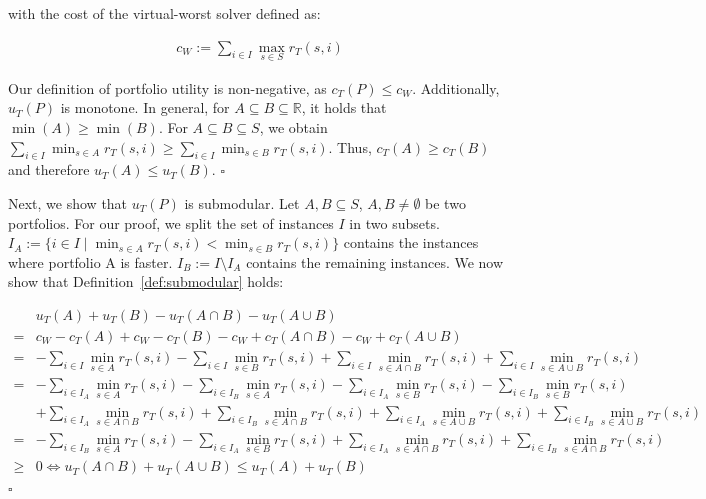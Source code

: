 \documentclass[conference]{IEEEtran}
\begin{document}
with the cost of the virtual-worst solver defined as:

\begin{align*}
	c_W := \sum_{i \in I}{\max_{s \in S}{r_T(s,i)}} \tag*{Virtual Worst Solver}
\end{align*}

Our definition of portfolio utility is non-negative, as $c_{T}(P) \leq c_W$.
Additionally, $u_{T}(P)$ is monotone.
In general, for $A \subseteq B \subseteq \mathbb{R}$, it holds that $\min(A) \geq \min(B)$.
For $A \subseteq B \subseteq S$, we obtain $\sum_{i \in I}{\min_{s \in A}{r_T(s,i)}} \geq \sum_{i \in I}{\min_{s \in B}{r_T(s,i)}}$.
Thus, $c_{T}(A) \geq c_{T}(B)$ and therefore $u_{T}(A) \leq u_{T}(B)$. \hfill$\square$

Next, we show that $u_{T}(P)$ is submodular.
Let $A,B \subseteq S$, $A,B \neq \emptyset$ be two portfolios.
For our proof, we split the set of instances $I$ in two subsets.
$I_A := \{i \in I \mid \min_{s \in A}{r_T(s,i)} < \min_{s \in B}{r_T(s,i)} \}$ contains the instances where portfolio A is faster.
$I_B := I \setminus I_A$ contains the remaining instances.
We now show that Definition~\ref{def:submodular} holds:

\begin{align*}
	& u_{T}(A) + u_{T}(B) - u_{T}(A \cap B) - u_{T}(A \cup B)\\
	= & c_W - c_{T}(A) + c_W - c_{T}(B) - c_W + c_{T}(A \cap B) - c_W + c_{T}(A \cup B)\\
	= & - \sum_{i \in I}{\min_{s \in A}{r_T(s,i)}} - \sum_{i \in I}{\min_{s \in B}{r_T(s,i)}} + \sum_{i \in I}{\min_{s \in A \cap B}{r_T(s,i)}} + \sum_{i \in I}{\min_{s \in A \cup B}{r_T(s,i)}}\\
	= & - \sum_{i \in I_A}{\min_{s \in A}{r_T(s,i)}} - \sum_{i \in I_B}{\min_{s \in A}{r_T(s,i)}} - \sum_{i \in I_A}{\min_{s \in B}{r_T(s,i)}} - \sum_{i \in I_B}{\min_{s \in B}{r_T(s,i)}}\\
	& + \sum_{i \in I_A}{\min_{s \in A \cap B}{r_T(s,i)}} + \sum_{i \in I_B}{\min_{s \in A \cap B}{r_T(s,i)}} + \sum_{i \in I_A}{\min_{s \in A \cup B}{r_T(s,i)}} + \sum_{i \in I_B}{\min_{s \in A \cup B}{r_T(s,i)}}\\
	= & - \sum_{i \in I_B}{\min_{s \in A}{r_T(s,i)}} - \sum_{i \in I_A}{\min_{s \in B}{r_T(s,i)}} + \sum_{i \in I_A}{\min_{s \in A \cap B}{r_T(s,i)}} + \sum_{i \in I_B}{\min_{s \in A \cap B}{r_T(s,i)}}\\
	\geq & 0 \Leftrightarrow u_{T}(A \cap B) + u_{T}(A \cup B) \leq u_{T}(A) + u_{T}(B)
\end{align*}\hfill$\square$
\end{document}
